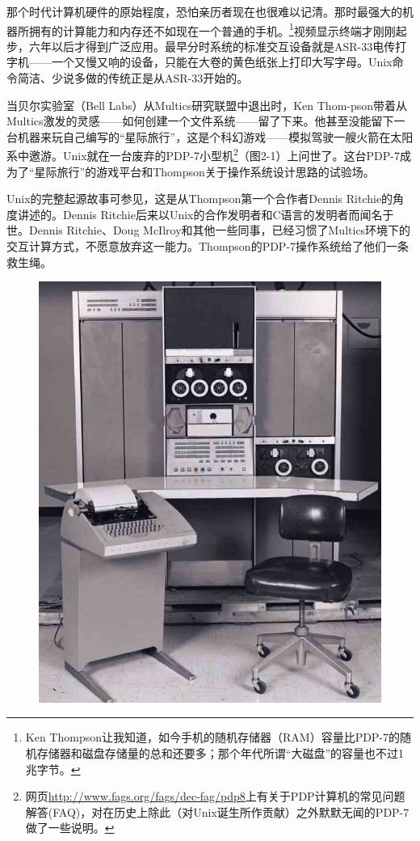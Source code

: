 \documentclass[12pt,oneside]{book}
\begin{document}
那个时代计算机硬件的原始程度，恐怕亲历者现在也很难以记清。那时最强大的机器所拥有的计算能力和内存还不如现在一个普通的手机。\footnote{Ken Thompson让我知道，如今手机的随机存储器（RAM）容量比PDP-7的随机存储器和磁盘存储量的总和还要多；那个年代所谓“大磁盘”的容量也不过1兆字节。}视频显示终端才刚刚起步，六年以后才得到广泛应用。最早分时系统的标准交互设备就是ASR-33电传打字机——一个又慢又响的设备，只能在大卷的黄色纸张上打印大写字母。Unix命令简洁、少说多做的传统正是从ASR-33开始的。

当贝尔实验室（Bell Labs）从Multics研究联盟中退出时，Ken Thom-pson带着从Multics激发的灵感——如何创建一个文件系统——留了下来。他甚至没能留下一台机器来玩自己编写的“星际旅行”，这是个科幻游戏——模拟驾驶一艘火箭在太阳系中邀游。Unix就在一台废弃的PDP-7小型机\footnote{网页\href{http://www.fags.org/fags/dec-fag/pdp8}{http://www.fags.org/fags/dec-fag/pdp8}上有关于PDP计算机的常见问题解答(FAQ)，对在历史上除此（对Unix诞生所作贡献）之外默默无闻的PDP-7做了一些说明。}（图2-1）上问世了。这台PDP-7成为了“星际旅行”的游戏平台和Thompson关于操作系统设计思路的试验场。

Unix的完整起源故事可参见\cite{Ritchie79}，这是从Thompson第一个合作者Dennis Ritchie的角度讲述的。Dennis Ritchie后来以Unix的合作发明者和C语言的发明者而闻名于世。Dennis Ritchie、Doug McIlroy和其他一些同事，已经习惯了Multics环境下的交互计算方式，不愿意放弃这一能力。Thompson的PDP-7操作系统给了他们一条救生绳。

\begin{figure}[H]
\centering
\includegraphics[scale=1 , keepaspectratio]{PDP-7.jpg}
\end{figure}
\end{document}

